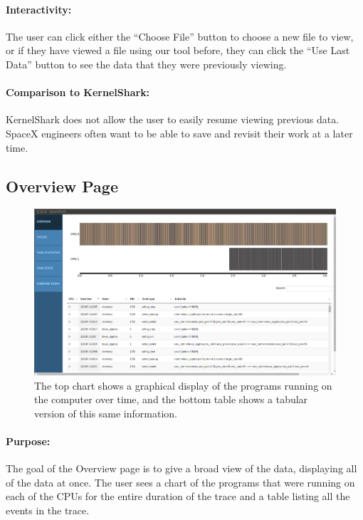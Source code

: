 \documentclass{hmcclinic}
\begin{document}
\paragraph{Interactivity:}
The user can click either the ``Choose File'' button to choose a new file to view, or if they have viewed a file using our tool before, they can click the ``Use Last Data'' button to see the data that they were previously viewing.

\paragraph{Comparison to KernelShark:}
KernelShark does not allow the user to easily resume viewing previous data. SpaceX engineers often want to be able to save and revisit their work at a later time. 


  \subsection{Overview Page} 
  
  \begin{figure}[H]
  \centering
      \includegraphics[width=5in]{overview-page.png}
  \caption{The top chart shows a graphical display of the programs running on the computer over time, and the bottom table shows a tabular version of this same information.}
  \end{figure}

\paragraph{Purpose:} 
The goal of the Overview page is to give a broad view of the data, displaying
all of the data at once.  The user sees a chart of the programs that were
running on each of the CPUs for the entire duration of the trace and a table
listing all the events in the trace.
\end{document}
